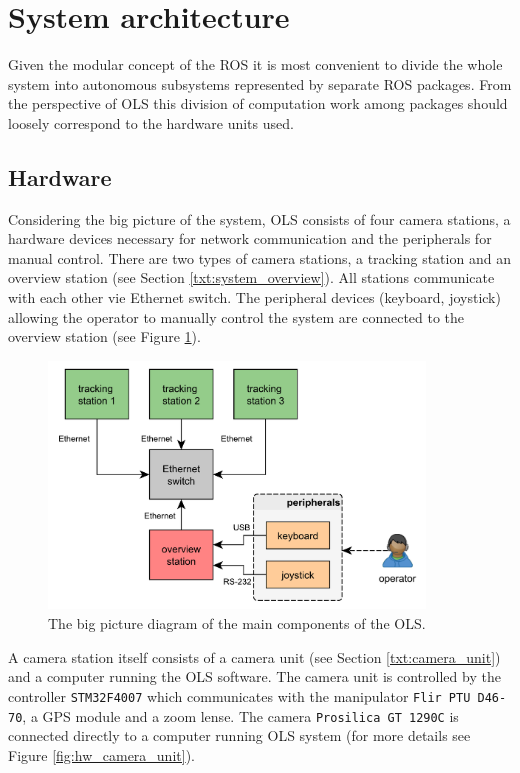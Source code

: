 \section{System architecture}

Given the modular concept of the ROS it is most convenient to divide the whole system into autonomous subsystems represented by separate ROS packages. From the perspective of OLS this division of computation work among packages should loosely correspond to the hardware units used.

\subsection{Hardware} \label{txt:hardware}

Considering the big picture of the system, OLS consists of four camera stations, a hardware devices necessary for network communication and the peripherals for manual control. There are two types of camera stations, a tracking station and an overview station (see Section \ref{txt:system_overview}). All stations communicate with each other vie Ethernet switch. The peripheral devices (keyboard, joystick) allowing the operator to manually control the system are connected to the overview station (see Figure \ref{fig:hw_ols}).

\begin{figure}[htb]
	\centering
	\includegraphics[width=10cm]{fig/hw_ols.pdf}
	\caption{The big picture diagram of the main components of the OLS.}
	\label{fig:hw_ols}
\end{figure}

A camera station itself consists of a camera unit (see Section \ref{txt:camera_unit}) and a computer running the OLS software. The camera unit is controlled by the controller \texttt{STM32F4007} which communicates with the manipulator \texttt{Flir PTU D46-70}, a GPS module and a zoom lense. The camera \texttt{Prosilica GT 1290C} is connected directly to a computer running OLS system (for more details see Figure \ref{fig:hw_camera_unit}).

